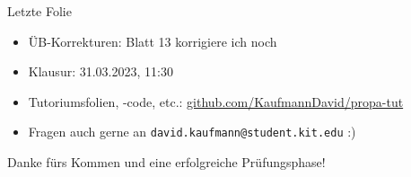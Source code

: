 \documentclass{beamer}
\begin{document}
\begin{frame}{Letzte Folie}
  \begin{itemize}
    \item ÜB-Korrekturen: Blatt 13 korrigiere ich noch
    \item Klausur: 31.03.2023, 11:30
    \item Tutoriumsfolien, -code, etc.: \href{https://github.com/KaufmannDavid/propa-tut}{github.com/KaufmannDavid/propa-tut}
    \item Fragen auch gerne an \texttt{david.kaufmann@student.kit.edu} :)
  \end{itemize}

  \vfill

  Danke fürs Kommen und eine erfolgreiche Prüfungsphase!
\end{frame}
\end{document}
